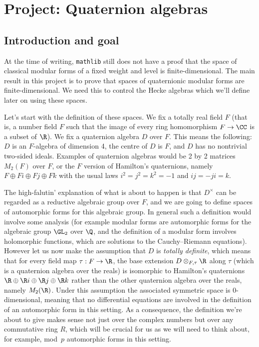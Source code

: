 \chapter{Project: Quaternion algebras}\label{Quat_alg_project}

\section{Introduction and goal}

At the time of writing, {\tt mathlib} still does not have a proof that the space
of classical modular forms of a fixed weight and level is finite-dimensional. The main result
in this project is to prove that spaces of quaternionic modular forms are
finite-dimensional. We need this to control the Hecke algebras which we'll define
later on using these spaces.

Let's start with the definition of these spaces. We fix a totally real field $F$
(that is, a number field $F$ such that the image of every ring homomorphism $F\to\CC$
is a subset of $\R$). We fix a quaternion algebra $D$ over $F$. This means
the following: $D$ is an $F$-algebra of dimension 4, the centre of $D$ is $F$,
and $D$ has no nontrivial two-sided ideals. Examples of quaternion algebras
would be 2 by 2 matrices $M_2(F)$ over $F$, or the $F$ version of Hamilton's quaternions,
namely $F\oplus Fi\oplus Fj\oplus Fk$ with the usual laws $i^2=j^2=k^2=-1$ and
$ij=-ji=k$.

The high-falutin' explanation of what is about to happen is that $D^\times$
can be regarded as a reductive algebraic group over $F$, and we are going to define spaces
of automorphic forms for this algebraic group. In general such a definition would
involve some analysis (for example modular forms are automorphic forms for the
algebraic group $\GL_2$ over $\Q$, and the definition of a modular form involves
holomorphic functions, which are solutions to the Cauchy--Riemann equations).
However let us now make the assumption that $D$ is
\emph{totally definite}, which means that for every field map $\tau:F\to\R$,
the base extension $D\otimes_{F,\tau}\R$ along $\tau$ (which is a quaternion algebra
over the reals) is isomorphic to Hamilton's quaternions
$\R\oplus \R i\oplus\R j\oplus\R k$ rather than the other quaternion algebra
over the reals, namely $M_2(\R)$. Under this assumption the associated symmetric space
is 0-dimensional, meaning that no differential equations are involved in the definition
of an automorphic form in this setting. As a consequence, the definition we're about to give
makes sense not just over the complex numbers but over any commutative ring $R$, which will
be crucial for us as we will need to think about, for example, mod~$p$ automorphic forms in this
setting.

